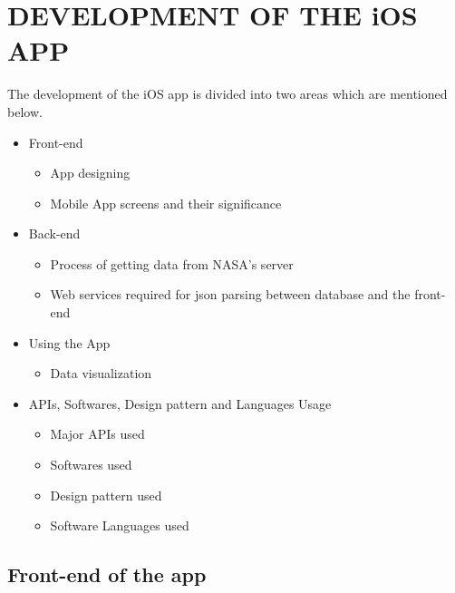 \chapter{DEVELOPMENT OF THE iOS APP}
\label{chap:development of the app}

The development of the iOS app is divided into two areas which are mentioned below.

\begin{itemize}
    \item Front-end
        \begin{itemize}
            \item App designing
            \item Mobile App screens and their significance \\
        \end{itemize}

    \item Back-end
        \begin{itemize}
            \item Process of getting data from NASA's server
            \item Web services required for \gls{json} parsing between database and the front-end \\
        \end{itemize}
        
    \item Using the App
        \begin{itemize}
            \item Data visualization
        \end{itemize}
    
     \item APIs, Softwares, Design pattern and Languages Usage
        \begin{itemize}
            \item Major APIs used
            \item Softwares used
            \item Design pattern used
            \item Software Languages used \\
        \end{itemize}    
\end{itemize}

\section{Front-end of the app}

